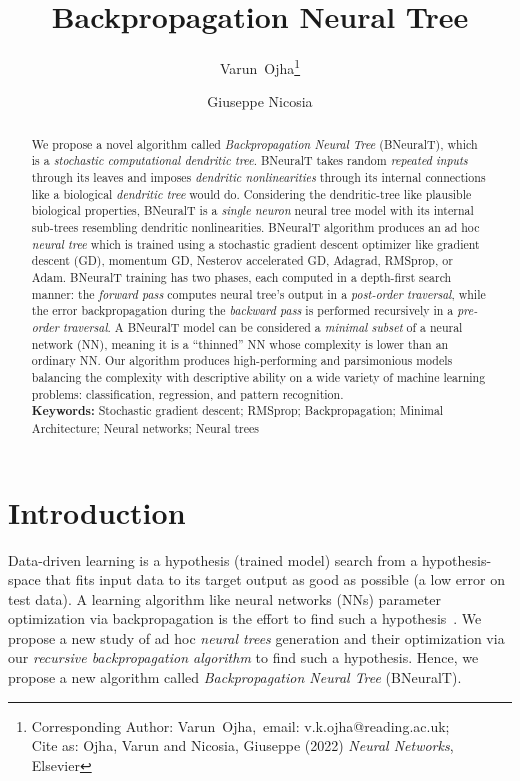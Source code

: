 \documentclass[11pt,a4paper]{article}
\title{\textbf{Backpropagation Neural Tree}}
\author[1]{Varun~Ojha\thanks{Corresponding Author: Varun~Ojha,~email: v.k.ojha@reading.ac.uk; \\Cite as: Ojha, Varun and Nicosia, Giuseppe (2022) \textit{Neural Networks}, Elsevier}}
\author[2,3]{Giuseppe Nicosia}
\affil[1]{Department of Computer Science, University of Reading, Reading, UK}
\affil[2]{Center of System Biology, University of Cambridge, Cambridge, UK}
\affil[3]{Department of Biomedical \& Biotechnological Sciences, University of Catania, Catania, Italy}
\date{}
\begin{document}
    
\onehalfspacing
\maketitle
    
    \begin{abstract}
        We propose a novel algorithm called \textit{Backpropagation Neural Tree} (BNeuralT), which is a \textit{stochastic computational dendritic tree}.
BNeuralT takes random \textit{repeated inputs} through its leaves and imposes \textit{dendritic nonlinearities} through its internal connections like a biological \textit{dendritic tree} would do. 
Considering the dendritic-tree like plausible biological properties, BNeuralT is a \textit{single neuron} neural tree model with its internal sub-trees resembling  dendritic nonlinearities.
BNeuralT algorithm produces an ad hoc \textit{neural tree} which is trained using a stochastic gradient descent optimizer like gradient descent (GD), momentum GD, Nesterov accelerated GD, Adagrad, RMSprop, or Adam. 
BNeuralT training has two phases, each computed in a depth-first search manner: the \textit{forward pass} computes neural tree's output in a \textit{post-order traversal}, while the error backpropagation during the \textit{backward pass} is performed recursively in a \textit{pre-order traversal}. 
A BNeuralT model can be considered a \textit{minimal subset} of a neural network (NN), meaning it is a ``thinned'' NN whose complexity is lower than an ordinary NN. 
Our algorithm produces high-performing and parsimonious models balancing the complexity with descriptive ability on a wide variety of machine learning problems: classification, regression, and pattern recognition. 
        ~\\
        \textbf{Keywords:} Stochastic gradient descent; RMSprop; Backpropagation; Minimal Architecture; Neural networks; Neural trees
    \end{abstract}
    
    \section{Introduction}
    \label{sec:intro}
Data-driven learning is a hypothesis (trained model) search from a hypothesis-space that fits input data to its target output as good as possible (a low error on test data). 
A learning algorithm like neural networks (NNs) parameter optimization via backpropagation is the effort to find such a hypothesis~\citep{annBpRumelhart1986}. 
We propose a new study of ad hoc \textit{neural trees} 
    generation and their optimization via our \textit{recursive backpropagation algorithm} to find such a hypothesis. 
Hence, we propose a new algorithm called \textit{Backpropagation Neural Tree} (BNeuralT). 
    
\end{document}
